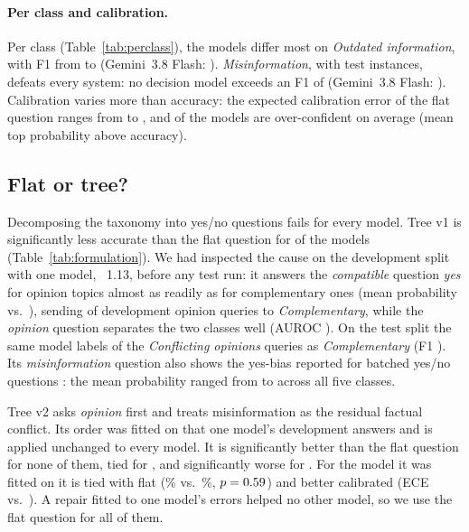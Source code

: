 

\paragraph{Per class and calibration.} Per class (Table~\ref{tab:perclass}), the models differ most on
\emph{Outdated information}, with F1 from \outdfmin to \outdfmax (Gemini~3.8 Flash: \gthreeeightoutdf).
\emph{Misinformation}, with \nmisitest test instances, defeats every system: no decision model exceeds an F1 of
\misifmax (Gemini~3.8 Flash: \gthreeeightmisif). Calibration varies more than accuracy: the expected calibration
error of the flat question ranges from \eceminimum to \ecemaximum, and \noverconf of the \ndm models are
over-confident on average (mean top probability above accuracy).

\subsection{Flat or tree?}
\label{sec:formulation}



Decomposing the taxonomy into yes/no questions fails for every model. Tree v1 is significantly less accurate than
the flat question for \nvoneworse of the \ndm models (Table~\ref{tab:formulation}). We had inspected the cause on the
development split with one model, \jev~1.13, before any test run: it answers the \emph{compatible} question
\emph{yes} for opinion topics almost as readily as for complementary ones (mean probability \devcompatopin vs.\
\devcompatcomp), sending \devopintocomp of \devnopin development opinion queries to \emph{Complementary}, while the
\emph{opinion} question separates the two classes well (AUROC \devopinionauroc). On the test split the same model
labels \testopintocomp of the \testnopin \emph{Conflicting opinions} queries as \emph{Complementary} (F1
\treeoneopinf). Its \emph{misinformation} question also shows the yes-bias reported for batched yes/no questions
\citep{deusser2026jev}: the mean probability ranged from \devmisinfolo to \devmisinfohi across all five classes.

Tree v2 asks \emph{opinion} first and treats misinformation as the residual factual conflict. Its order was fitted on
that one model's development answers and is applied unchanged to every model. It is significantly better than the
flat question for none of them, tied for \nvtwotied, and significantly worse for \nvtwoworse. For the model it was
fitted on it is tied with flat (\jevtreeacc\% vs.\ \jevflatacc\%, $p=0.59$) and better calibrated (ECE
\jevtreeece vs.\ \jevece). A repair fitted to one model's errors helped no other model, so we use the flat question
for all of them.

